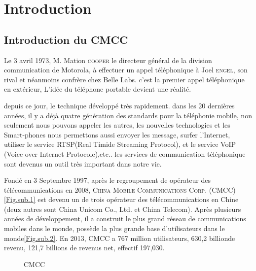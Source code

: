 \section{Introduction} %
 \subsection{Introduction du CMCC}
Le 3 avril 1973, M. Mation \textsc{cooper} le directeur général de la division communication de Motorola, à effectuer un appel téléphonique à Joel \textsc{engel}, son rival et néanmoins confrère chez \textsf{Belle Labs}. c'est la premier appel téléphonique en extérieur, L'idée du téléphone portable devient une réalité. 


depuis ce jour, le technique développé très rapidement. dans les 20 dernières années, il y a déjà quatre génération des standards pour la téléphonie mobile, non seulement nous pouvons appeler les autres, les nouvelles technologies et les Smart-phones nous permettons aussi envoyer les message, surfer l'Internet, utiliser le service RTSP(Real Timide Streaming Protocol), et le service VoIP (Voice over Internet Protocole),etc.. les services de communication téléphonique sont devenus un outil très important dans notre vie.
 
 
Fondé en 3 Septembre 1997, après le regroupement de opérateur des télécommunications en 2008, \textsc{China Mobile Communications Corp.} (\textsf{CMCC})\ref{Fig.sub.1} est devenu un de trois opérateur des télécommunications en Chine (deux autres sont \textsf{China Unicom Co., Ltd.} et \textsf{China Telecom}). Après plusieurs années de développement, il a construit le plus grand réseau de communications mobiles dans le monde, possède la plus grande base d'utilisateurs dans le monde\ref{Fig.sub.2}. En 2013, CMCC a 767 million utilisateurs, 630,2 billion\textyen de revenu, 121,7 billions \textyen de revenus net, effectif 197,030.
\begin{figure}[H]
	\flushleft
	\hfill
	\hspace{1in}
	\caption{CMCC} 
\end{figure}


